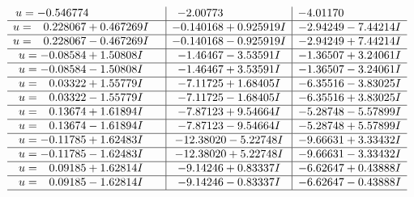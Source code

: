 \documentclass[1p]{elsarticle_modified}
\theoremstyle{definition}
\begin{document}
$$\begin{array}{c|c|c}
\begin{aligned}
u &= -0.546774\phantom{ +0.000000I}\end{aligned}
 & -2.00773\phantom{ +0.000000I} & -4.01170\phantom{ +0.000000I} \\ \hline\begin{aligned}
u &= \phantom{-}0.228067 + 0.467269 I\end{aligned}
 & -0.140168 + 0.925919 I & -2.94249 - 7.44214 I \\ \hline\begin{aligned}
u &= \phantom{-}0.228067 - 0.467269 I\end{aligned}
 & -0.140168 - 0.925919 I & -2.94249 + 7.44214 I \\ \hline\begin{aligned}
u &= -0.08584 + 1.50808 I\end{aligned}
 & -1.46467 - 3.53591 I & -1.36507 + 3.24061 I \\ \hline\begin{aligned}
u &= -0.08584 - 1.50808 I\end{aligned}
 & -1.46467 + 3.53591 I & -1.36507 - 3.24061 I \\ \hline\begin{aligned}
u &= \phantom{-}0.03322 + 1.55779 I\end{aligned}
 & -7.11725 + 1.68405 I & -6.35516 - 3.83025 I \\ \hline\begin{aligned}
u &= \phantom{-}0.03322 - 1.55779 I\end{aligned}
 & -7.11725 - 1.68405 I & -6.35516 + 3.83025 I \\ \hline\begin{aligned}
u &= \phantom{-}0.13674 + 1.61894 I\end{aligned}
 & -7.87123 + 9.54664 I & -5.28748 - 5.57899 I \\ \hline\begin{aligned}
u &= \phantom{-}0.13674 - 1.61894 I\end{aligned}
 & -7.87123 - 9.54664 I & -5.28748 + 5.57899 I \\ \hline\begin{aligned}
u &= -0.11785 + 1.62483 I\end{aligned}
 & -12.38020 - 5.22748 I & -9.66631 + 3.33432 I \\ \hline\begin{aligned}
u &= -0.11785 - 1.62483 I\end{aligned}
 & -12.38020 + 5.22748 I & -9.66631 - 3.33432 I \\ \hline\begin{aligned}
u &= \phantom{-}0.09185 + 1.62814 I\end{aligned}
 & -9.14246 + 0.83337 I & -6.62647 + 0.43888 I \\ \hline\begin{aligned}
u &= \phantom{-}0.09185 - 1.62814 I\end{aligned}
 & -9.14246 - 0.83337 I & -6.62647 - 0.43888 I\\
 \hline 
 \end{array}$$\newpage
\end{document}
